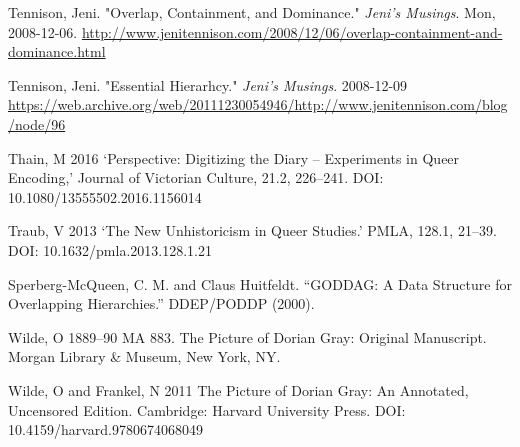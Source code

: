 \documentclass[11pt]{article}
\begin{document}
Tennison, Jeni. "Overlap, Containment, and Dominance." \emph{Jeni's
Musings}. Mon,
2008-12-06. \url{http://www.jenitennison.com/2008/12/06/overlap-containment-and-dominance.html}  

Tennison, Jeni. "Essential Hierarhcy." \emph{Jeni's
Musings}. 2008-12-09
\url{https://web.archive.org/web/20111230054946/http://www.jenitennison.com/blog/node/96}

Thain, M 2016 ‘Perspective: Digitizing the Diary --
Experiments in Queer Encoding,' Journal of Victorian Culture, 21.2,
226--241. DOI: 10.1080/13555502.2016.1156014

Traub, V 2013 ‘The New Unhistoricism in Queer Studies.' PMLA,
128.1, 21--39. DOI: 10.1632/pmla.2013.128.1.21

Sperberg-McQueen, C. M. and Claus Huitfeldt. “GODDAG: A Data Structure
for Overlapping Hierarchies.” DDEP/PODDP (2000).

Wilde, O 1889--90 MA 883. The Picture of Dorian Gray:
Original Manuscript. Morgan Library \& Museum, New York, NY.

Wilde, O and Frankel, N 2011 The Picture of Dorian Gray: An
Annotated, Uncensored Edition. Cambridge: Harvard University Press. DOI:
10.4159/harvard.9780674068049
\end{document}
